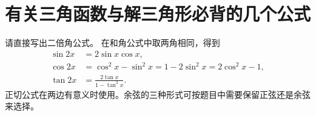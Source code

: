 \par\addvspace{12pt}

\section{有关三角函数与解三角形必背的几个公式}

\label{sol:sec:functions:5}

请直接写出二倍角公式。
\solutionanswer
在和角公式中取两角相同，得到
\[
\begin{aligned}
\sin2x&=2\sin x\cos x,\\
\cos2x&=\cos^2x-\sin^2x=1-2\sin^2x=2\cos^2x-1,\\
\tan2x&=\frac{2\tan x}{1-\tan^2x}.
\end{aligned}
\]
正切公式在两边有意义时使用。余弦的三种形式可按题目中需要保留正弦还是余弦来选择。
\par
